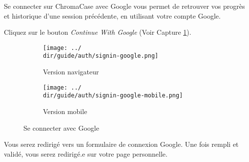 Se connecter sur ChromaCase avec Google vous permet de retrouver vos progrès et historique d’une session précédente, en utilisant votre compte Google.


Cliquez sur le bouton \textit{Continue With Google} (Voir Capture \ref{fig:signin-google}).

\begin{figure}[H]
	\begin{subfigure}[b]{0.7\textwidth}
		\texttt{[image: ../\\dir/guide/auth/signin-google.png]}
		\caption{Version navigateur}
	\end{subfigure}
	\begin{subfigure}[b]{0.25\textwidth}
		\texttt{[image: ../\\dir/guide/auth/signin-google-mobile.png]}
		\caption{Version mobile}
	\end{subfigure}
	\caption{Se connecter avec Google}	
	\label{fig:signin-google}
\end{figure}

Vous serez redirigé vers un formulaire de connexion Google. Une fois rempli et validé, vous serez redirigé.e sur votre page personnelle.